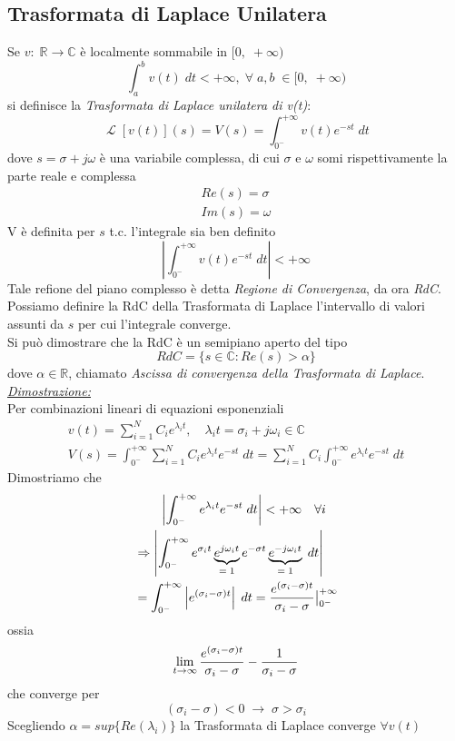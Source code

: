 \documentclass{article}
\newcommand{\Laplace}{\mathop{\mathcal{L}}}
\begin{document}
		\subsection{Trasformata di Laplace Unilatera}
			Se $ v:\; \mathbb{R} \rightarrow \mathbb{C} $ è localmente sommabile in $ [0,\;+\infty) $
			\[
				\int_{a}^{b} {v(t)\; dt} < +\infty,\; \forall\; a,b\; \in [0,\;+\infty)
			\]
			si definisce la \textit{Trasformata di Laplace unilatera di v(t)}:
			\[
				\Laplace[v(t)](s) = V(s) = \int_{0^-}^{+\infty} {v(t)e^{-st}\; dt}
			\]
			dove $ s = \sigma + j\omega $ è una variabile complessa, di cui $ \sigma \text{ e } \omega $ somi rispettivamente la parte reale e complessa
			\[
				\begin{gathered}
					Re(s) = \sigma \\
					Im(s) = \omega
				\end{gathered}
			\]
			V è definita per $ s $ t.c. l'integrale sia ben definito
			\[
				\left| \int_{0^-}^{+\infty} {v(t)e^{-st}\; dt} \right| < +\infty
			\]
			Tale refione del piano complesso è detta \textit{Regione di Convergenza}, da ora \textit{RdC}. \\
			Possiamo definire la RdC della Trasformata di Laplace l'intervallo di valori assunti da $ s $ per cui l'integrale converge. \\
			Si può dimostrare che la RdC è un semipiano aperto del tipo
			\[
				RdC = \{s \in \mathbb{C}: Re(s) > \alpha\}
			\]
			dove $ \alpha \in \mathbb{R} $, chiamato \textit{Ascissa di convergenza della Trasformata di Laplace}.\\
			\underline{\textit{Dimostrazione:}}\\
			Per combinazioni lineari di equazioni esponenziali
			\[
				\begin{gathered}
					v(t) = \sum_{i=1}^{N} {C_i e^{\lambda_it}},\quad \lambda_it = \sigma_i + j\omega_i \in \mathbb{C} \\
					V(s) = \int_{0^-}^{+\infty} {\sum_{i=1}^{N} {C_i e^{\lambda_it}} e^{-st}\; dt} = \sum_{i=1}^{N} {C_i} \int_{0^-}^{+\infty} {e^{\lambda_it} e^{-st}\; dt}
				\end{gathered}
			\]
			Dimostriamo che
			\[
				\begin{aligned}
					&\quad\quad \left| \int_{0^-}^{+\infty} {e^{\lambda_it} e^{-st}\; dt} \right| < +\infty\quad \forall i \\
					&\Rightarrow \left| \int_{0^-}^{+\infty} {e^{\sigma_it} \underbrace{e^{j\omega_it}}_{=\; 1} e^{-\sigma t} \underbrace{e^{-j\omega_it}}_{=\; 1} \; dt} \right| \\
					&= \int_{0^-}^{+\infty} {\left| e^{(\sigma_i - \sigma)t} \right|\; dt} = {{e^{(\sigma_i - \sigma)t}}\over{\sigma_i - \sigma}} \bigr\vert_{0^-}^{+\infty}
				\end{aligned}
			\]
			ossia
			\[
				\lim_{t \to \infty} {{{e^{(\sigma_i - \sigma)t}}\over{\sigma_i - \sigma}} - {{1}\over{\sigma_i - \sigma}}}
			\]
			che converge per
			\[
				(\sigma_i - \sigma) < 0\; \rightarrow\; \sigma > \sigma_i
			\]
			Scegliendo $ \alpha = sup\{Re(\lambda_i)\} $ la Trasformata di Laplace converge $ \forall v(t) $
\end{document}
